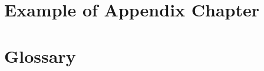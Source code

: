\chapter{Example of Appendix Chapter} \label{appendix}

\chapter{Glossary}
\glsaddall
\printglossary
\printglossary[type=\acronymtype]
